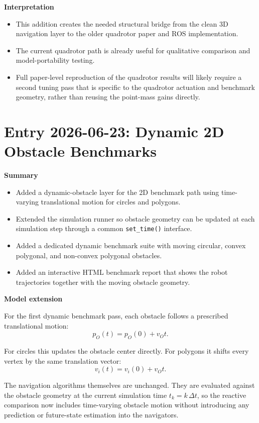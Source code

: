\documentclass[11pt]{article}
\begin{document}
\textbf{Interpretation}

\begin{itemize}[leftmargin=*]
  \item This addition creates the needed structural bridge from the clean 3D navigation layer to the older quadrotor paper and ROS implementation.
  \item The current quadrotor path is already useful for qualitative comparison and model-portability testing.
  \item Full paper-level reproduction of the quadrotor results will likely require a second tuning pass that is specific to the quadrotor actuation and benchmark geometry, rather than reusing the point-mass gains directly.
\end{itemize}

\section*{Entry 2026-06-23: Dynamic 2D Obstacle Benchmarks}

\textbf{Summary}

\begin{itemize}[leftmargin=*]
  \item Added a dynamic-obstacle layer for the 2D benchmark path using time-varying translational motion for circles and polygons.
  \item Extended the simulation runner so obstacle geometry can be updated at each simulation step through a common \texttt{set\_time()} interface.
  \item Added a dedicated dynamic benchmark suite with moving circular, convex polygonal, and non-convex polygonal obstacles.
  \item Added an interactive HTML benchmark report that shows the robot trajectories together with the moving obstacle geometry.
\end{itemize}

\textbf{Model extension}

For the first dynamic benchmark pass, each obstacle follows a prescribed
translational motion:
\[
p_O(t) = p_O(0) + v_O t .
\]

For circles this updates the obstacle center directly. For polygons it shifts
every vertex by the same translation vector:
\[
v_i(t) = v_i(0) + v_O t .
\]

The navigation algorithms themselves are unchanged. They are evaluated against
the obstacle geometry at the current simulation time \(t_k = k\,\Delta t\), so
the reactive comparison now includes time-varying obstacle motion without
introducing any prediction or future-state estimation into the navigators.
\end{document}
